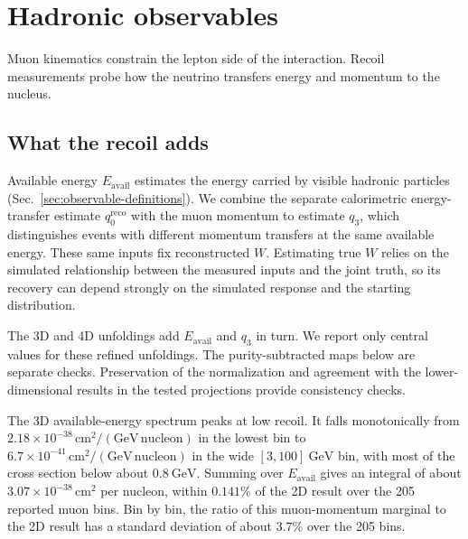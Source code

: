 \section{Hadronic observables}
\label{sec:part-higher-dimensional}
\label{sec:part-q3}

Muon kinematics constrain the lepton side of the interaction. Recoil measurements probe how the neutrino transfers energy and momentum to the nucleus.

\subsection{What the recoil adds}
\label{sec:higher-dimensional-extension}
\label{sec:3d}
\label{sec:uq-higherdim}

Available energy $E_{\mathrm{avail}}$ estimates the energy carried by visible hadronic particles (Sec.~\ref{sec:observable-definitions}). We combine the separate calorimetric energy-transfer estimate $q_0^{\mathrm{reco}}$ with the muon momentum to estimate $q_3$, which distinguishes events with different momentum transfers at the same available energy. These same inputs fix reconstructed $W$. Estimating true $W$ relies on the simulated relationship between the measured inputs and the joint truth, so its recovery can depend strongly on the simulated response and the starting distribution.

The 3D and 4D unfoldings add $E_{\mathrm{avail}}$ and $q_3$ in turn. We report only central values for these refined unfoldings. The purity-subtracted maps below are separate checks. Preservation of the normalization and agreement with the lower-dimensional results in the tested projections provide consistency checks.

\label{sec:3d-spectrum}
The 3D available-energy spectrum peaks at low recoil. It falls monotonically from $2.18\times10^{-38}\,\mathrm{cm}^2/(\mathrm{GeV}\,\text{nucleon})$ in the lowest bin to $6.7\times10^{-41}\,\mathrm{cm}^2/(\mathrm{GeV}\,\text{nucleon})$ in the wide $[3,100]~\mathrm{GeV}$ bin, with most of the cross section below about $0.8~\mathrm{GeV}$.
\label{sec:3d-anchor}Summing over $E_{\mathrm{avail}}$ gives an integral of about $3.07\times10^{-38}\,\mathrm{cm}^2$ per nucleon, within $0.141\%$ of the 2D result over the 205 reported muon bins. Bin by bin, the ratio of this muon-momentum marginal to the 2D result has a standard deviation of about $3.7\%$ over the 205 bins.

